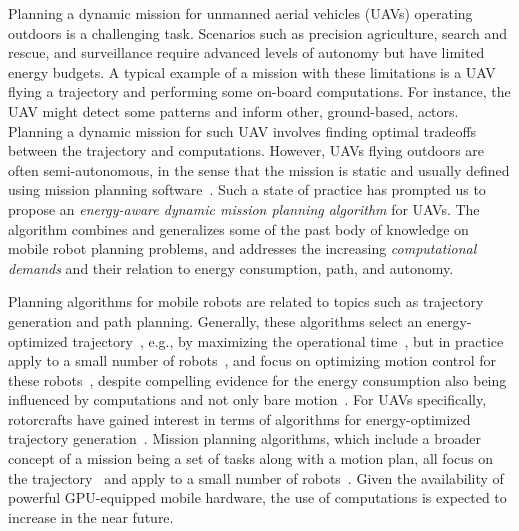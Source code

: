 \documentclass[letterpaper,10pt,conference]{ieeeconf}
\theoremstyle{definition}
\begin{document}
Planning a dynamic mission for unmanned aerial vehicles (UAVs) operating outdoors is a challenging task. Scenarios such as precision agriculture, search and rescue, and surveillance require advanced levels of autonomy but have limited energy budgets. A typical example of a mission with these limitations is a UAV flying a trajectory and performing some on-board computations. For instance, the UAV might detect some patterns and inform other, ground-based, actors. Planning a dynamic mission for such UAV involves finding optimal tradeoffs between the trajectory and computations. However, UAVs flying outdoors are often semi-autonomous, in the sense that the mission is static and usually defined using mission planning software~\cite{daponte2019review}. Such a state of practice has prompted us to propose an \emph{energy-aware dynamic mission planning algorithm} for UAVs. The algorithm combines and generalizes some of the past body of knowledge on mobile robot planning problems, and addresses the increasing \emph{computational demands} and their relation to energy consumption, path, and autonomy.

Planning algorithms for mobile robots are related to topics such as trajectory generation and path planning. Generally, these algorithms select an energy-optimized trajectory~\cite{mei2004energy}, e.g., by maximizing the operational time~\cite{wahab2015energy}, but in practice apply to a small number of robots~\cite{kim2005energy}, and focus on optimizing motion control for these robots~\cite{kim2008minimum}, despite compelling evidence for the energy consumption also being influenced by computations and not only bare motion~\cite{mei2005case}. For UAVs specifically, rotorcrafts have gained interest in terms of algorithms for energy-optimized trajectory generation~\cite{morbidi2016minimum,kreciglowa2017energy}. Mission planning algorithms, which include a broader concept of a mission being a set of tasks along with a motion plan, all focus on the trajectory~\cite{mei2005case,mei2006deployment} and apply to a small number of robots~\cite{sadrpour2013mission,sadrpour2013experimental}. Given the availability of powerful GPU-equipped mobile hardware, the use of computations is expected to increase in the near future.
\end{document}

